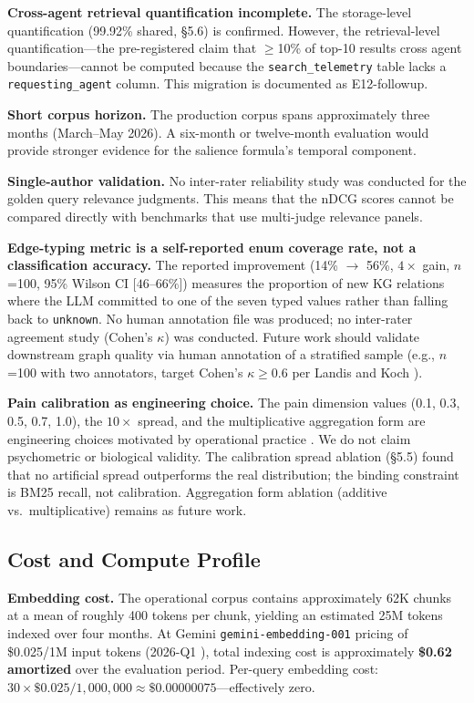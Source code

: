 \textbf{Cross-agent retrieval quantification incomplete.} The storage-level quantification
(99.92\% shared, \S5.6) is confirmed. However, the retrieval-level quantification---the
pre-registered claim that $\geq$10\% of top-10 results cross agent boundaries---cannot be
computed because the \texttt{search\_telemetry} table lacks a \texttt{requesting\_agent}
column. This migration is documented as E12-followup.

\textbf{Short corpus horizon.} The production corpus spans approximately three months
(March--May 2026). A six-month or twelve-month evaluation would provide stronger evidence
for the salience formula's temporal component.

\textbf{Single-author validation.} No inter-rater reliability study was conducted for the
golden query relevance judgments. This means that the nDCG scores cannot be compared
directly with benchmarks that use multi-judge relevance panels.

\textbf{Edge-typing metric is a self-reported enum coverage rate, not a classification
accuracy.} The reported improvement (14\% $\to$ 56\%, $4\times$ gain, $n$=100, 95\%
Wilson CI $[46$--$66\%]$) measures the proportion of new KG relations where the LLM
committed to one of the seven typed values rather than falling back to
\texttt{unknown}. No human annotation file was produced; no inter-rater agreement study
(Cohen's $\kappa$) was conducted. Future work should validate downstream graph quality via
human annotation of a stratified sample (e.g., $n$=100 with two annotators, target
Cohen's $\kappa \geq 0.6$ per Landis and Koch \cite{landis1977measurement}).

\textbf{Pain calibration as engineering choice.} The pain dimension values (0.1, 0.3, 0.5,
0.7, 1.0), the $10\times$ spread, and the multiplicative aggregation form are engineering
choices motivated by operational practice \cite{pagerduty2023severity,beyer2016site}. We
do not claim psychometric or biological validity. The calibration spread ablation
(\S5.5) found that no artificial spread outperforms the real distribution; the binding
constraint is BM25 recall, not calibration. Aggregation form ablation (additive
vs.\ multiplicative) remains as future work.

\subsection{Cost and Compute Profile}

\textbf{Embedding cost.} The operational corpus contains approximately 62K chunks at a
mean of roughly 400 tokens per chunk, yielding an estimated 25M tokens indexed over four
months. At Gemini \texttt{gemini-embedding-001} pricing of \$0.025/1M input tokens
(2026-Q1 \cite{google2026pricing}), total indexing cost is approximately
\textbf{\$0.62 amortized} over the evaluation period. Per-query embedding cost:
$30 \times \$0.025 / 1{,}000{,}000 \approx \$0.00000075$---effectively zero.

